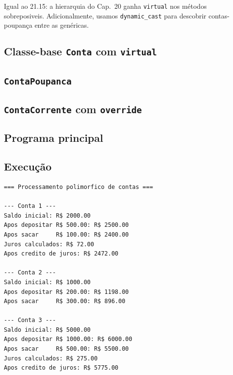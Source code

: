 \documentclass[11pt,a4paper]{article}
\begin{document}
Igual ao 21.15: a hierarquia do Cap.~20 ganha \texttt{virtual} nos m\'etodos sobreposiveis. Adicionalmente, usamos \texttt{dynamic\_cast} para descobrir contas-poupan\c{c}a entre as gen\'ericas.

\subsection*{Classe-base \texttt{Conta} com \texttt{virtual}}




\subsection*{\texttt{ContaPoupanca}}




\subsection*{\texttt{ContaCorrente} com \texttt{override}}




\subsection*{Programa principal}



\subsection*{Execu\c{c}\~ao}

\begin{saidabox}
\begin{lstlisting}[style=terminal]
=== Processamento polimorfico de contas ===

--- Conta 1 ---
Saldo inicial: R$ 2000.00
Apos depositar R$ 500.00: R$ 2500.00
Apos sacar     R$ 100.00: R$ 2400.00
Juros calculados: R$ 72.00
Apos credito de juros: R$ 2472.00

--- Conta 2 ---
Saldo inicial: R$ 1000.00
Apos depositar R$ 200.00: R$ 1198.00
Apos sacar     R$ 300.00: R$ 896.00

--- Conta 3 ---
Saldo inicial: R$ 5000.00
Apos depositar R$ 1000.00: R$ 6000.00
Apos sacar     R$ 500.00: R$ 5500.00
Juros calculados: R$ 275.00
Apos credito de juros: R$ 5775.00
\end{lstlisting}
\end{saidabox}
\end{document}
